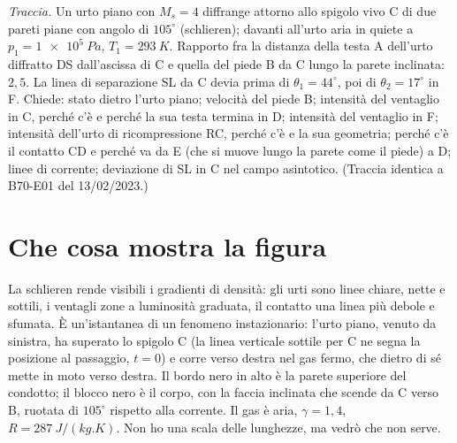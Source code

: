 

\graphicspath{{../../svolgimenti/1970-03-01_E01_diffrazione_urto/figure/}}



\maketitle

\emph{Traccia.} Un urto piano con $M_s=4$ diffrange attorno allo spigolo vivo C di due pareti piane con angolo di
$105^\circ$ (schlieren); davanti all'urto aria in quiete a $p_1=\SI{1e5}{Pa}$, $T_1=\SI{293}{K}$. Rapporto fra la
distanza della testa A dell'urto diffratto DS dall'ascissa di C e quella del piede B da C lungo la parete inclinata:
$2{,}5$. La linea di separazione SL da C devia prima di $\theta_1=44^\circ$, poi di $\theta_2=17^\circ$ in F. Chiede:
stato dietro l'urto piano; velocità del piede B; intensità del ventaglio in C, perché c'è e perché la sua testa
termina in D; intensità del ventaglio in F; intensità dell'urto di ricompressione RC, perché c'è e la sua geometria;
perché c'è il contatto CD e perché va da E (che si muove lungo la parete come il piede) a D; linee di corrente;
deviazione di SL in C nel campo asintotico. (Traccia identica a B70-E01 del 13/02/2023.)

\section*{Che cosa mostra la figura}
La schlieren rende visibili i gradienti di densità: gli urti sono linee chiare, nette e sottili, i ventagli zone a
luminosità graduata, il contatto una linea più debole e sfumata. È un'istantanea di un fenomeno instazionario:
l'urto piano, venuto da sinistra, ha superato lo spigolo C (la linea verticale sottile per C ne segna la posizione al
passaggio, $t=0$) e corre verso destra nel gas fermo, che dietro di sé mette in moto verso destra. Il bordo nero in
alto è la parete superiore del condotto; il blocco nero è il corpo, con la faccia inclinata che scende da C verso B,
ruotata di $105^\circ$ rispetto alla corrente. Il gas è aria, $\gamma=1{,}4$, $R=\SI{287}{J/(kg.K)}$. Non ho una
scala delle lunghezze, ma vedrò che non serve.

